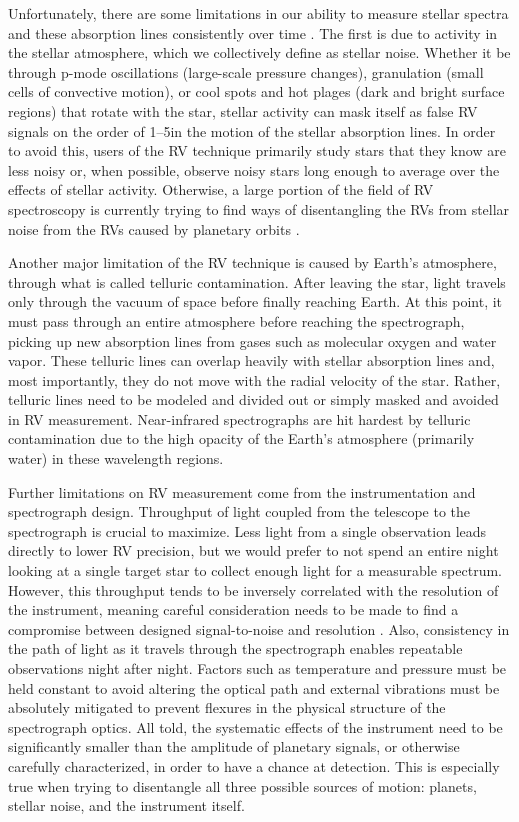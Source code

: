 Unfortunately, there are some limitations in our ability to measure stellar spectra and these absorption lines consistently over time \citep{lovis_radial_2011}. The first is due to activity in the stellar atmosphere, which we collectively define as stellar noise. Whether it be through p-mode oscillations (large-scale pressure changes), granulation (small cells of convective motion), or cool spots and hot plages (dark and bright surface regions) that rotate with the star, stellar activity can mask itself as false RV signals on the order of 1--5\ms in the motion of the stellar absorption lines. In order to avoid this, users of the RV technique primarily study stars that they know are less noisy or, when possible, observe noisy stars long enough to average over the effects of stellar activity. Otherwise, a large portion of the field of RV spectroscopy is currently trying to find ways of disentangling the RVs from stellar noise from the RVs caused by planetary orbits \citep[e.g.][]{davis_insights_2017, dumusque_measuring_2018}.

Another major limitation of the RV technique is caused by Earth's atmosphere, through what is called telluric contamination. After leaving the star, light travels only through the vacuum of space before finally reaching Earth. At this point, it must pass through an entire atmosphere before reaching the spectrograph, picking up new absorption lines from gases such as molecular oxygen and water vapor. These telluric lines can overlap heavily with stellar absorption lines and, most importantly, they do not move with the radial velocity of the star. Rather, telluric lines need to be modeled and divided out \citep[e.g.][]{leet_toward_2019} or simply masked and avoided in RV measurement. Near-infrared spectrographs are hit hardest by telluric contamination due to the high opacity of the Earth's atmosphere (primarily water) in these wavelength regions.

Further limitations on RV measurement come from the instrumentation and spectrograph design. Throughput of light coupled from the telescope to the spectrograph is crucial to maximize. Less light from a single observation leads directly to lower RV precision, but we would prefer to not spend an entire night looking at a single target star to collect enough light for a measurable spectrum. However, this throughput tends to be inversely correlated with the resolution of the instrument, meaning careful consideration needs to be made to find a compromise between designed signal-to-noise and resolution \citep{davis_insights_2017}. Also, consistency in the path of light as it travels through the spectrograph enables repeatable observations night after night. Factors such as temperature and pressure must be held constant to avoid altering the optical path and external vibrations must be absolutely mitigated to prevent flexures in the physical structure of the spectrograph optics. All told, the systematic effects of the instrument need to be significantly smaller than the amplitude of planetary signals, or otherwise carefully characterized, in order to have a chance at detection. This is especially true when trying to disentangle all three possible sources of motion: planets, stellar noise, and the instrument itself.

